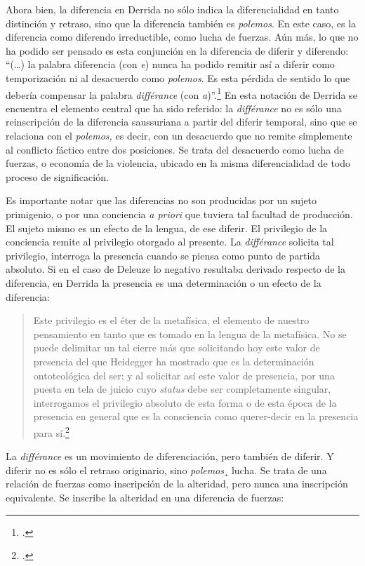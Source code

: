 Ahora bien, la diferencia en Derrida no sólo indica la diferencialidad en tanto distinción y retraso, sino que la diferencia también es \emph{polemos}. En este caso, es la diferencia como diferendo irreductible, como lucha de fuerzas. Aún más, lo que no ha podido ser pensado es esta conjunción en la diferencia de diferir y diferendo: \enquote{(\dots) la palabra diferencia (con \emph{e}) nunca ha podido remitir así a diferir como temporización ni al desacuerdo como \emph{polemos}. Es esta pérdida de sentido lo que debería compensar  la palabra \emph{différance} (con \emph{a})}.\footcite[8]{@6980-DERRIDA1989} En esta notación de Derrida se encuentra el elemento central que ha sido referido: la \emph{différance} no es sólo una reinscripción de la diferencia saussuriana a partir del diferir temporal, sino que se relaciona con el \emph{polemos,} es decir, con un desacuerdo que no remite simplemente al conflicto fáctico entre dos posiciones. Se trata del desacuerdo como lucha de fuerzas, o economía de la violencia, ubicado en la misma diferencialidad de todo proceso de significación.

Es importante notar que las diferencias no son producidas por un sujeto primigenio, o por una conciencia \emph{a priori} que tuviera tal facultad de producción. El sujeto mismo es un efecto de la lengua, de ese diferir. El privilegio de la conciencia remite al privilegio otorgado al presente. La \emph{différance} solicita tal privilegio, interroga la presencia cuando se piensa como punto de partida absoluto. Si en el caso de Deleuze lo negativo resultaba derivado respecto de la diferencia, en Derrida la presencia es una determinación o un efecto de la diferencia:

\begin{quote}
Este privilegio es el éter de la metafísica, el elemento de nuestro pensamiento en tanto que es tomado en la lengua de la metafísica. No se puede delimitar un tal cierre más que solicitando hoy este valor de presencia del que Heidegger ha mostrado que es la determinación ontoteológica del ser; y al solicitar así este valor de presencia, por una puesta en tela de juicio cuyo \emph{status} debe ser completamente singular, interrogamos el privilegio absoluto de esta forma o de esta época de la presencia en general que es la consciencia como querer-decir en la presencia para sí.\footcite[17]{@6980-DERRIDA1989}
\end{quote}

La \emph{différance} es un movimiento de diferenciación, pero también de diferir. Y diferir no es sólo el retraso originario, sino \emph{polemos}¸ lucha. Se trata de una relación de fuerzas como inscripción de la alteridad, pero nunca una inscripción equivalente. Se inscribe la alteridad en una diferencia de fuerzas:

